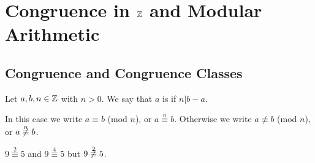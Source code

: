 \documentclass[11pt,fleqn,dvipsnames,usenames]{article}
\begin{document}
\section{Congruence in $\mathbb{Z}$ and Modular Arithmetic}\label{congruencechapter}

\subsection{Congruence and Congruence Classes}

\begin{definition}\label{congruenceoperations}
Let $a,b,n\in\mathbb{Z}$ with $n > 0$.  We say that $a$ is  if $n|b-a$.
\end{definition}

\notation In this case we write $a\equiv b$ (mod $n$), or $a\overset{n}{\equiv}b$.  Otherwise we write $a\not\equiv b$ (mod $n$), or $a\not\overset{n}{\equiv}b$.

\example $9\overset{2}{\equiv}5$ and $9\overset{4}\equiv{5}$ but $9\not\overset{2}{\equiv}5$.
\end{document}
